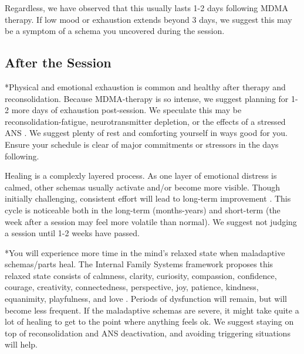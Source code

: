 \documentclass[12pt,letterpaper]{article}
\begin{document}
Regardless, we have observed that this usually lasts 1-2 days following MDMA therapy. If low mood or exhaustion extends beyond 3 days, we suggest this may be a symptom of a schema you uncovered during the session. 
\subsection{After the Session}
\label{after}
*Physical and emotional exhaustion is common and healthy after therapy and reconsolidation. Because MDMA-therapy is so intense, we suggest planning for 1-2 more days of exhaustion post-session. We speculate this may be reconsolidation-fatigue, neurotransmitter depletion, or the effects of a stressed ANS \cite{razviPSIP}. We suggest plenty of rest and comforting yourself in ways good for you. Ensure your schedule is clear of major commitments or stressors in the days following. 

Healing is a complexly layered process. As one layer of emotional distress is calmed, other schemas usually activate and/or become more visible. Though initially challenging, consistent effort will lead to long-term improvement \cite{vanderKolkBody}. This cycle is noticeable both in the long-term (months-years) and short-term (the week after a session may feel more volatile than normal). We suggest not judging a session until 1-2 weeks have passed.

*You will experience more time in the mind's relaxed state when maladaptive schemas/parts heal. The Internal Family Systems framework proposes this relaxed state consists of calmness, clarity, curiosity, compassion, confidence, courage, creativity, connectedness, perspective, joy, patience, kindness, equanimity, playfulness, and love \cite{schwartzIFS}. Periods of dysfunction will remain, but will become less frequent. If the maladaptive schemas are severe, it might take quite a lot of healing to get to the point where anything feels ok. We suggest staying on top of reconsolidation and ANS deactivation, and avoiding triggering situations will help. 
\end{document}
